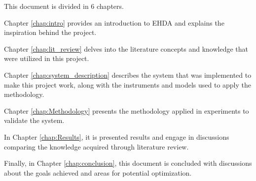 This document is divided in 6 chapters. 

Chapter \ref{chap:intro} provides an introduction to EHDA and explains the inspiration behind the project.

Chapter \ref{chap:lit_review} delves into the literature concepts and knowledge that were utilized in this project.

Chapter \ref{chap:system_description} describes the system that was implemented to make this project work, along with the instruments and models used to apply the methodology.

Chapter \ref{chap:Methodology} presents the methodology applied in experiments to validate the system.

In Chapter \ref{chap:Results}, it is presented results and engage in discussions comparing the knowledge acquired through literature review.

Finally, in Chapter \ref{chap:conclusion}, this document is concluded with discussions about the goals achieved and areas for potential optimization.
